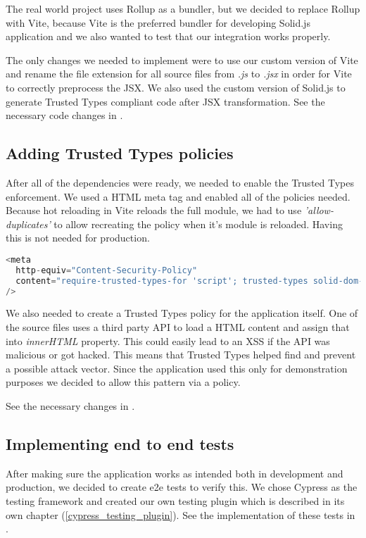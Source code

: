 The real world project uses Rollup as a bundler, but we decided to replace Rollup with Vite,
because Vite is the preferred bundler for developing Solid.js application and we also wanted to test
that our integration works properly.

The only changes we needed to implement were to use our custom version of Vite and rename the file
extension for all source files from \emph{.js} to \emph{.jsx} in order for Vite to correctly
preprocess the JSX. We also used the custom version of Solid.js to generate Trusted Types compliant
code after JSX transformation. See the necessary code changes in
\cite{solid_realworld_project:vite}.

\subsection{Adding Trusted Types policies}

After all of the dependencies were ready, we needed to enable the Trusted Types enforcement. We used
a HTML meta tag and enabled all of the policies needed. Because hot reloading in Vite reloads the
full module, we had to use \emph{'allow-duplicates'} to allow recreating the policy when it's
module is reloaded. Having this is not needed for production.

\bigskip
\begin{lstlisting}[language=JavaScript, caption=Creation of style elements using \emph{innerHTML} in Vite \cite{commit_vite_inner_html_styles}]
<meta
  http-equiv="Content-Security-Policy"
  content="require-trusted-types-for 'script'; trusted-types solid-dom-expressions trusted-article vite-overlay 'allow-duplicates';"
/>
\end{lstlisting}

We also needed to create a Trusted Types policy for the application itself. One of the source files
uses a third party API to load a HTML content and assign that into \emph{innerHTML} property. This
could easily lead to an XSS if the API was malicious or got hacked. This means that Trusted Types
helped find and prevent a possible attack vector. Since the application used this only for
demonstration purposes we decided to allow this pattern via a policy.

See the necessary changes in \cite{solid_realworld_project:tt_policy}.

\subsection{Implementing end to end tests}

After making sure the application works as intended both in development and production, we decided
to create e2e tests to verify this. We chose Cypress as the testing framework and created our own
testing plugin which is described in its own chapter (\ref{cypress_testing_plugin}). See the
implementation of these tests in \cite{solid_realworld_project:tests}.
